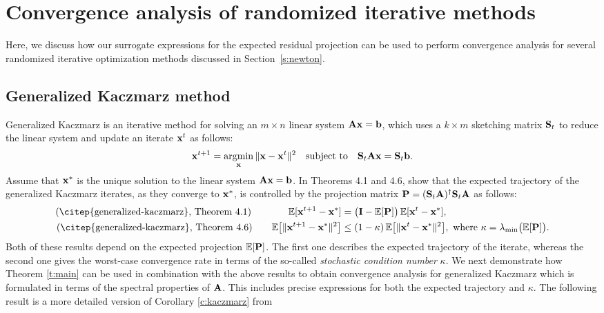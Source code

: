 \documentclass[../../thesis.tex]{subfiles}
\begin{document}
\section{Convergence analysis of randomized iterative methods}
\label{a:newton}

Here, we discuss how our surrogate expressions for the expected
residual projection can be used to perform convergence analysis for
several randomized iterative optimization methods discussed in
Section~\ref{s:newton}.

\subsection{Generalized Kaczmarz method}
Generalized Kaczmarz \citep{generalized-kaczmarz} is an iterative
method for solving an $m\times n$ linear system
$\A\x=\b$, which uses a $k\times m$ sketching matrix $\S_t$ to reduce
the linear system and update an iterate $\x^t$ as follows:
\begin{align*}
  \x^{t+1} = \argmin_\x\|\x-\x^t\|^2\quad\textnormal{subject to}\quad\S_t\A\x=\S_t\b.
\end{align*}
Assume that $\x^*$ is the unique solution to the linear system $\A\x=\b$. In Theorems 4.1 and 4.6, \citep{generalized-kaczmarz} show that the
expected trajectory of the generalized Kaczmarz iterates, as
they converge to $\x^*$, is controlled
by the projection matrix $\P=(\S_t\A)^\dagger\S_t\A$ as follows:
\begin{align*}
  \text{(\citep{generalized-kaczmarz}, Theorem 4.1)}\qquad\quad \ \ \,
  \E[\x^{t+1}-\x^*]
   & = \big(\I-\E[\P]\big)\,\E[\x^t-\x^*],         \\
  \text{(\citep{generalized-kaczmarz}, Theorem 4.6)}\qquad
  \E\big[\|\x^{t+1}-\x^*\|^2\big]
   & \leq (1-\kappa)\,\E\big[\|\x^t-\x^*\|^2\big],
  \text{ where }\kappa=\lambda_{\min}\big(\E[\P]\big).
\end{align*}
Both of these results depend on the expected projection
$\E[\P]$. The first one describes the expected trajectory of the
iterate, whereas the second one gives the worst-case convergence
rate in terms of the so-called \emph{stochastic condition number}
$\kappa$. We next demonstrate how Theorem \ref{t:main} can be used  in
combination with the above results to
obtain convergence analysis for generalized Kaczmarz which is
formulated in terms of the spectral properties of $\A$. This includes
precise expressions for both the expected trajectory and $\kappa$. The following
result is a more detailed version of Corollary \ref{c:kaczmarz} from
\end{document}
